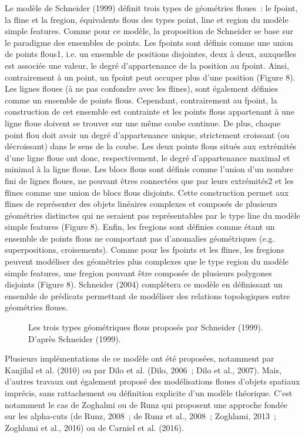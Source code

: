 Le modèle de Schneider (1999) définit trois types de géométries
floues : le fpoint, la fline et la fregion, équivalents flous des
types point, line et region du modèle simple features. Comme pour ce
modèle, la proposition de Schneider se base sur le paradigme des
ensembles de points. Les fpoints sont définis comme une union de
points flous1, i.e. un ensemble de positions disjointes, deux à deux,
auxquelles est associée une valeur, le degré d’appartenance de la
position au fpoint. Ainsi, contrairement à un point, un fpoint peut
occuper plus d’une position (Figure 8). Les lignes floues (à ne pas
confondre avec les flines), sont également définies comme un ensemble
de points flous. Cependant, contrairement au fpoint, la construction
de cet ensemble est contrainte et les points flous appartenant à une
ligne floue doivent se trouver sur une même coube continue. De plus,
chaque point flou doit avoir un degré d’appartenance unique,
strictement croissant (ou décroissant) dans le sens de la coube. Les
deux points flous situés aux extrémités d’une ligne floue ont donc,
respectivement, le degré d’appartenance maximal et minimal à la ligne
floue. Les blocs flous sont définis comme l’union d’un nombre fini de
lignes floues, ne pouvant êtres connectées que par leurs extrémités2
et les flines comme une union de blocs flous disjoints. Cette
construction permet aux flines de représenter des objets linéaires
complexes et composés de plusieurs géométries distinctes qui ne
seraient pas représentables par le type line du modèle simple features
(Figure 8). Enfin, les fregions sont définies comme étant un ensemble
de points flous ne comportant pas d’anomalies géométriques
(e.g. superpositions, croisements). Comme pour les fpoints et les
flines, les fregions peuvent modéliser des géométries plus complexes
que le type region du modèle simple features, une fregion pouvant être
composée de plusieurs polygones disjoints (Figure 8). Schneider (2004)
complétera ce modèle en définissant un ensemble de prédicats
permettant de modéliser des relations topologiques entre géométries
floues.

\begin{figure}
  \centering
  \caption{Les trois types géométriques flous proposés par Schneider
    (1999). D’après Schneider (1999).}
  \label{fig:mod_schneider}
\end{figure}

Plusieurs implémentations de ce modèle ont été proposées, notamment
par Kanjilal et al. (2010) ou par Dilo et al. (Dilo, 2006 ; Dilo et
al., 2007). Mais, d’autres travaux ont également proposé des
modélisations floues d’objets spatiaux imprécis, sans rattachement ou
définition explicite d’un modèle théorique. C’est notamment le cas de
Zoghalmi ou de Runz qui proposent une approche fondée sur les
alpha-cuts (de Runz, 2008 ; de Runz et al., 2008 ; Zoghlami, 2013 ;
Zoghlami et al., 2016) ou de Carniel et al. (2016).

